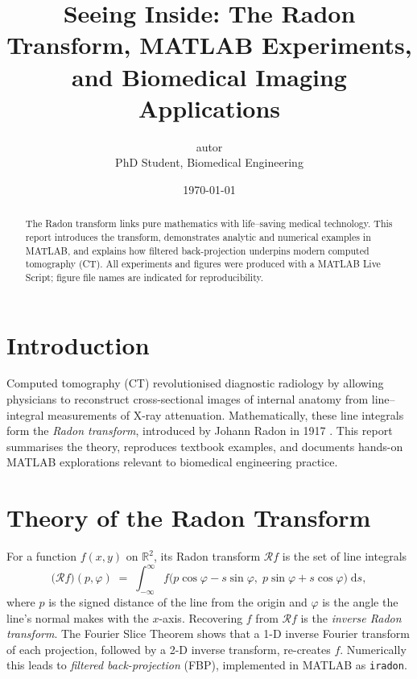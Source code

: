 \documentclass[11pt]{article}
\title{Seeing Inside:  The Radon Transform, MATLAB Experiments,\\
       and Biomedical Imaging Applications}
\author{autor\\
        PhD Student, Biomedical Engineering}
\date{\today}
\begin{document}
\maketitle

\begin{abstract}
The Radon transform links pure mathematics with life--saving medical
technology.  This report introduces the transform, demonstrates analytic
and numerical examples in MATLAB, and explains how filtered
back-projection underpins modern computed tomography (CT).
All experiments and figures were produced with a MATLAB Live Script;
figure file names are indicated for reproducibility.
\end{abstract}

\tableofcontents
\bigskip

\section{Introduction}

Computed tomography (CT) revolutionised diagnostic radiology by allowing
physicians to reconstruct cross-sectional images of internal anatomy
from line–integral measurements of X-ray attenuation.
Mathematically, these line integrals form the \emph{Radon transform},
introduced by Johann Radon in 1917 \cite{Radon1917}.  
This report summarises the theory, reproduces textbook examples, and
documents hands-on MATLAB explorations relevant to biomedical
engineering practice.

\section{Theory of the Radon Transform}

For a function \( f(x,y) \) on \( \mathbb R^{2} \),
its Radon transform \( \mathcal R f \) is the set of line
integrals
\begin{equation}
  \bigl(\mathcal R f\bigr)(p,\varphi)
  \;=\;
  \int_{-\infty}^{\infty}
    f\!\bigl(p\cos\varphi - s\sin\varphi,\;
             p\sin\varphi + s\cos\varphi\bigr)\; \mathrm ds,
  \label{eq:radon-def}
\end{equation}
where \( p \) is the signed distance of the line from the origin and
\( \varphi \) is the angle the line’s normal makes with the \(x\)-axis.
Recovering \(f\) from \( \mathcal R f \) is the \emph{inverse Radon
transform}.  The Fourier Slice Theorem shows that a 1-D inverse Fourier
transform of each projection, followed by a 2-D inverse transform,
re-creates \(f\).  Numerically this leads to
\emph{filtered back-projection} (FBP), implemented in MATLAB as
\texttt{iradon}.
\end{document}
